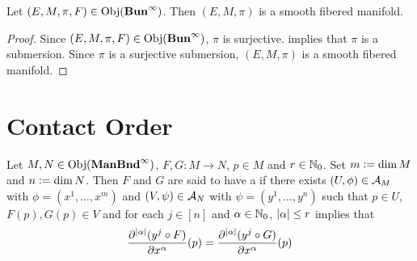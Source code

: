 \documentclass{book}
\begin{document}
\begin{ex} 
	Let $(E, M, \pi, F) \in \operatorname{Obj}(\operatorname*{\text{\textbf{Bun}}^{\infty}})$. Then $(E, M, \pi)$ is a smooth fibered manifold. 
\end{ex}

\begin{proof}
	Since $(E, M, \pi, F) \in \operatorname{Obj}(\operatorname*{\text{\textbf{Bun}}^{\infty}})$, $\pi$ is surjective.  implies that $\pi$ is a submersion. Since $\pi$ is a surjective submersion, $(E, M, \pi)$ is a smooth fibered manifold.
\end{proof}




































\newpage

\section{Contact Order} 

\begin{defn}
	Let $M, N \in \operatorname{Obj}(\operatorname*{\text{\textbf{ManBnd}}^{\infty}})$, $F, G: M \rightarrow N$, $p \in M$ and $r \in \mathbb{N}_0$. Set $m \vcentcolon= \dim M$ and $n \vcentcolon= \dim N$. Then $F$ and $G$ are said to have a  if there exists $(U, \phi) \in \mathcal{A}_M$ with $\phi = (x^1, \ldots, x^m)$ and $(V, \psi) \in \mathcal{A}_N$ with $\psi = (y^1, \ldots, y^n)$ such that $p \in U$, $F(p), G(p) \in V$ and for each $j \in [n]$ and $\alpha \in \mathbb{N}_0$, $|\alpha| \leq r$ implies that
	$$\frac{\partial^{|\alpha|} (y^j \circ F)}{\partial x^{\alpha}}(p) =  \frac{\partial^{|\alpha|} (y^j \circ G)}{\partial x^{\alpha}}(p)$$
\end{defn}
\end{document}
